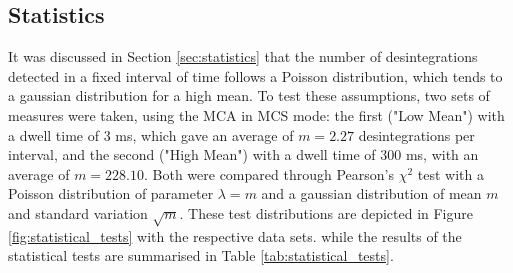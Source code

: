 \subsection{Statistics}
It was discussed in Section \ref{sec:statistics} that the number of desintegrations detected 
in a fixed interval of time follows a Poisson distribution, which tends to 
a gaussian distribution for a high mean.
To test these assumptions, two sets of measures were taken, using the MCA in MCS mode: 
the first ("Low Mean") with a dwell time of $3$ ms, which gave an average of $m = 2.27$ desintegrations per interval, 
and the second ("High Mean") with a dwell time of $300$ ms, with an average of $m = 228.10$.
Both were compared through Pearson's $\chi^2$ test 
with a Poisson distribution of parameter $\lambda = m$ 
and a gaussian distribution of mean $m$ and standard variation $\sqrt{m}$.
These test distributions are depicted in Figure \ref{fig:statistical_tests} with
the respective data sets.
while the results of the statistical tests are summarised in Table \ref{tab:statistical_tests}.
%
